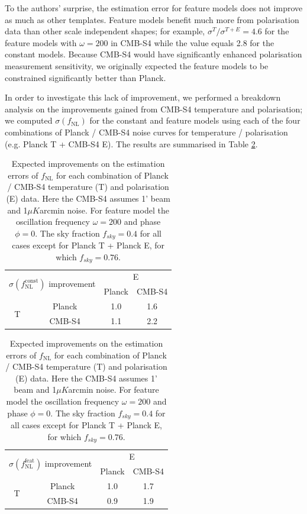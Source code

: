 To the authors' surprise, the estimation error for feature models does not improve as much as other templates. Feature models benefit much more from polarisation data than other scale independent shapes; for example, $\sigma^{T}/\sigma^{T+E} = 4.6$ for the feature models with $\omega=200$ in CMB-S4 while the value equals 2.8 for the constant models. Because CMB-S4 would have significantly enhanced polarisation measurement sensitivity, we originally expected the feature models to be constrained significantly better than Planck.

In order to investigate this lack of improvement, we performed a breakdown analysis on the improvements gained from CMB-S4 temperature and polarisation; we computed $\sigma(f_\text{NL})$ for the constant and feature models using each of the four combinations of Planck / CMB-S4 noise curves for temperature / polarisation (e.g. Planck T + CMB-S4 E). The results are summarised in Table \ref{forecast mixed}.

\begin{table}[ht]
	\centering
	\renewcommand{\arraystretch}{1.4}
	\parbox{.45\linewidth}{
		\begin{tabular}{cccc}
			\multicolumn{2}{c}{\multirow{2}{*}{$\sigma(f_\text{NL}^\text{const})$ improvement}}  &  \multicolumn{2}{c}{E} \\ 
			\multicolumn{2}{c}{} & Planck & CMB-S4 \\ \hline
			\multirow{2}{*}{T} & Planck & 1.0 & 1.6 \\
			& CMB-S4 & 1.1 & 2.2
		\end{tabular}
	}
	\parbox{.45\linewidth}{
		\begin{tabular}{cccc}
			\multicolumn{2}{c}{\multirow{2}{*}{$\sigma(f_\text{NL}^\text{feat})$ improvement}} &  \multicolumn{2}{c}{E} \\ 	\multicolumn{2}{c}{} & Planck & CMB-S4 \\ \hline
			\multirow{2}{*}{T} & Planck & 1.0 & 1.7 \\
			& CMB-S4 & 0.9 & 1.9
		\end{tabular}
	}
	\caption{Expected improvements on the estimation errors of $f_\text{NL}$ for each combination of Planck / CMB-S4 temperature (T) and polarisation (E) data. Here the CMB-S4 assumes 1' beam and 1$\mu K$arcmin noise. For feature model the oscillation frequency $\omega=200$ and phase $\phi=0$. The sky fraction $f_{sky}=0.4$ for all cases except for Planck T + Planck E, for which $f_{sky}=0.76$.}
	\label{forecast mixed}
\end{table}

